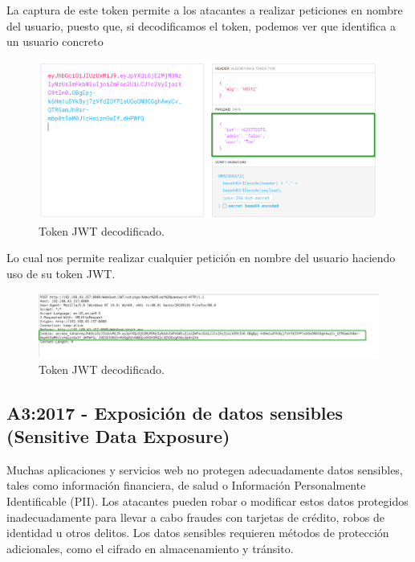 La captura de este token permite a los atacantes a realizar peticiones en nombre del usuario, puesto que, 
si decodificamos el token, podemos ver que identifica a un usuario concreto

\begin{figure}[!htb]
    \centering
    \captionsetup{width=1\linewidth}    
    \includegraphics[width=\linewidth]{./imagenes/014_BrokenAuthentication_2.png}
    \caption{Token JWT decodificado.}  
    \label{fig:Token JWT decodificado}
\end{figure}

\newpage
Lo cual nos permite realizar cualquier petición en nombre del usuario haciendo uso de su token JWT.

\begin{figure}[!htb] 
    \centering
    \captionsetup{width=1\linewidth}   
    \includegraphics[width=\linewidth]{./imagenes/014_BrokenAuthentication_3.png}
    \caption{Token JWT decodificado.}  
    \label{fig:Broken Authentication attack}
\end{figure}

\subsection{A3:2017 - Exposición de datos sensibles (Sensitive Data Exposure)}

Muchas aplicaciones y servicios web no protegen adecuadamente datos sensibles, tales como
información financiera, de salud o Información Personalmente Identificable (PII). Los atacantes
pueden robar o modificar estos datos protegidos inadecuadamente para llevar a cabo fraudes
con tarjetas de crédito, robos de identidad u otros delitos. Los datos sensibles requieren métodos
de protección adicionales, como el cifrado en almacenamiento y tránsito. 

